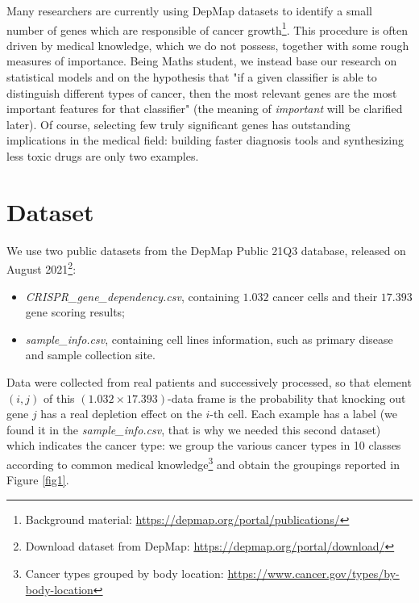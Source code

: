 \documentclass[a4paper,11pt, oneside]{article}  %
\begin{document}
Many researchers are currently using DepMap datasets to identify a small number of genes which are responsible of cancer growth\footnote{Background material: \url{https://depmap.org/portal/publications/}}. This procedure is often driven by medical knowledge,  which we do not possess,  together with some rough measures of importance.  Being Maths student, we instead base our research on statistical models and on the hypothesis that "if a given classifier is able to distinguish different types of cancer,  then the most relevant genes are the most important features for that classifier" (the meaning of \textit{important} will be clarified later).  Of course,  selecting few truly significant genes has outstanding implications in the medical field: building faster diagnosis tools and synthesizing less toxic drugs are only two examples. 


\section{Dataset}
We use two public datasets from the DepMap Public 21Q3 database,  released on August 2021\footnote{Download dataset from DepMap:  \url{https://depmap.org/portal/download/}}:
\begin{itemize}
	\item \textit{CRISPR\_gene\_dependency.csv}, containing $1.032$ cancer cells and their $17.393$ gene scoring results;
	\item \textit{sample\_info.csv}, containing cell lines information,  such as primary disease and sample collection site.
\end{itemize}
Data were collected from real patients and successively processed,  so that element $(i, j)$ of this $(1.032 \times 17.393)$-data frame is the probability that knocking out gene $j$ has a real depletion effect on the $i$-th cell.  Each example has a label (we found it in the \textit{sample\_info.csv}, that is why we needed this second dataset) which indicates the cancer type:  we group the various cancer types in 10 classes according to common medical knowledge\footnote{Cancer types grouped by body location: \url{https://www.cancer.gov/types/by-body-location}} and obtain the groupings reported in Figure \ref{fig1}. 
\end{document}
